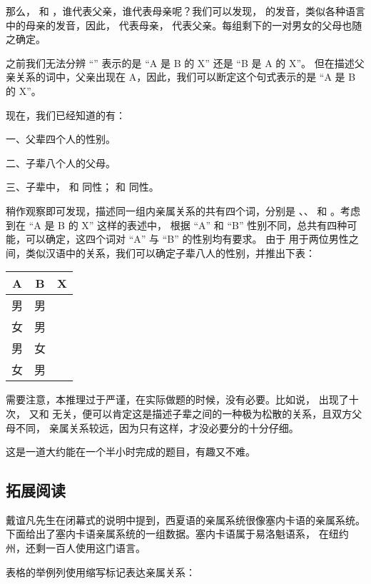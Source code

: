 那么，\word{\tangMo} 和 \word{\tangFa}，谁代表父亲，谁代表母亲呢？我们可以发现，
\word{\tangMo} 的发音，类似各种语言中的母亲的发音，因此，\word{\tangMo} 代表母亲，
\word{\tangFa} 代表父亲。每组剩下的一对男女的父母也随之确定。

之前我们无法分辨 “” 表示的是 “A 是 B 的 X” 还是 “B 是 A 的 X”。
但在描述父亲关系的词中，父亲出现在 A，因此，我们可以断定这个句式表示的是 “A 是 B 的 X”。

现在，我们已经知道的有：

一、父辈四个人的性别。

二、子辈八个人的父母。

三、子辈中，\word{\Huuyon} 和 \word{\Hooyon} 同性；\word{\Tiiyon} 和 \word{\Teeyon} 同性。

稍作观察即可发现，描述同一组内亲属关系的共有四个词，分别是 \word{\tamBr}、\word{\tamSi}、
\word{\tafBr} 和 \word{\tafSi}。考虑到在 “A 是 B 的 X” 这样的表述中，
根据 “A” 和 “B” 性别不同，总共有四种可能，可以确定，这四个词对 “A” 与 “B” 的性别均有要求。
由于 \word{\tamBr} 用于两位男性之间，类似汉语中的关系，我们可以确定子辈八人的性别，并推出下表：

\begin{tabular}{c|c|l}
\hline
A & B & X \\
\hline
男 & 男 & \word{\tamBr} \\ \hline
女 & 男 & \word{\tamSi} \\ \hline
男 & 女 & \word{\tafBr} \\ \hline
女 & 男 & \word{\tafSi} \\ \hline
\end{tabular}

需要注意，本推理过于严谨，在实际做题的时候，没有必要。比如说，\word{\txCoz} 出现了十次，
又和 \word{\Hoo} 无关，便可以肯定这是描述子辈之间的一种极为松散的关系，且双方父母不同，
亲属关系较远，因为只有这样，才没必要分的十分仔细。

这是一道大约能在一个半小时完成的题目，有趣又不难。

\subsection{拓展阅读}

戴谊凡先生在闭幕式的说明中提到，西夏语的亲属系统很像塞内卡语的亲属系统。
下面给出了塞内卡语亲属系统的一组数据\cite{Seneca}。塞内卡语属于易洛魁语系，
在纽约州，还剩一百人使用这门语言。

表格的举例列使用缩写标记表达亲属关系：

